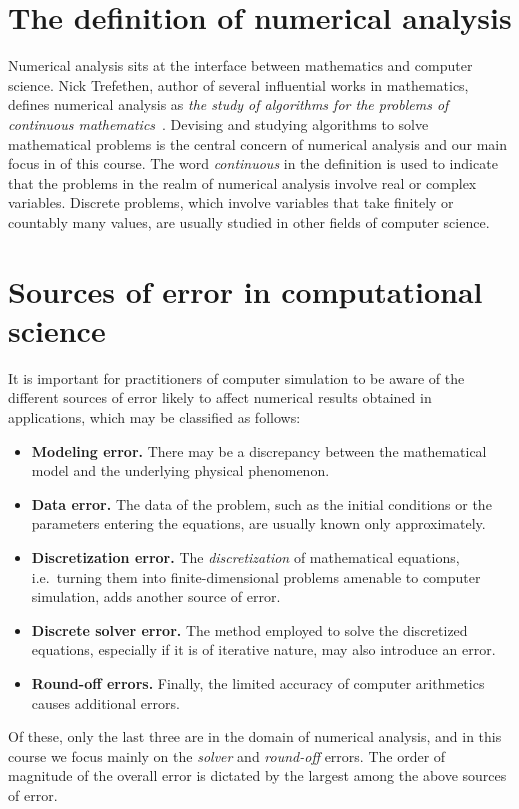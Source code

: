 \section*{The definition of numerical analysis}
Numerical analysis sits at the interface between mathematics and computer science.
Nick Trefethen,
author of several influential works in mathematics,
defines numerical analysis as \emph{the study of algorithms for the problems of continuous mathematics}~\cite{trefethen1992definition}.
Devising and studying algorithms to solve mathematical problems is the central concern of numerical analysis
and our main focus in of this course.
The word \emph{continuous} in the definition is used to indicate that
the problems in the realm of numerical analysis involve real or complex variables.
Discrete problems, which involve variables that take finitely or countably many values,
are usually studied in other fields of computer science.

\section*{Sources of error in computational science}%
\label{sec:sources_of_error}

It is important for practitioners of computer simulation to be aware of the different sources of error likely to affect numerical results obtained in applications,
which may be classified as follows:
\begin{itemize}
    \item
        \textbf{Modeling error.}
        There may be a discrepancy between the mathematical model and the underlying physical phenomenon.

    \item
        \textbf{Data error.}
        The data of the problem,
        such as the initial conditions or the parameters entering the equations,
        are usually known only approximately.

    \item
        \textbf{Discretization error.}
        The \emph{discretization} of mathematical equations,
        i.e.\ turning them into finite-dimensional problems amenable to computer simulation,
        adds another source of error.

    \item
        \textbf{Discrete solver error.}
        The method employed to solve the discretized equations,
        especially if it is of iterative nature,
        may also introduce an error.

    \item
        \textbf{Round-off errors.}
        Finally, the limited accuracy of computer arithmetics causes additional errors.
\end{itemize}
Of these,
only the last three are in the domain of numerical analysis,
and in this course we focus mainly on the \emph{solver} and \emph{round-off} errors.
The order of magnitude of the overall error is dictated by the largest among the above sources of error.

